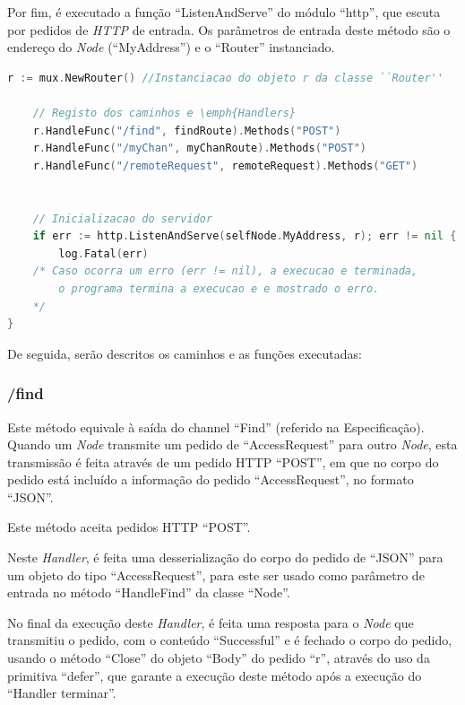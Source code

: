Por fim, é executado a função ``ListenAndServe'' do módulo ``http'', que escuta por pedidos de \emph{HTTP} de entrada.
Os parâmetros de entrada deste método são o endereço do \emph{Node} (``MyAddress'') e o ``Router'' instanciado.


\begin{lstlisting}[caption={Instanciacão e inicialização do servidor \acs{HTTP}},language=Go]
	r := mux.NewRouter() //Instanciacao do objeto r da classe ``Router''

	// Registo dos caminhos e \emph{Handlers}
	r.HandleFunc("/find", findRoute).Methods("POST")
	r.HandleFunc("/myChan", myChanRoute).Methods("POST")
	r.HandleFunc("/remoteRequest", remoteRequest).Methods("GET")


	// Inicializacao do servidor
	if err := http.ListenAndServe(selfNode.MyAddress, r); err != nil {
		log.Fatal(err) 				
	/* Caso ocorra um erro (err != nil), a execucao e terminada, 
		o programa termina a execucao e e mostrado o erro.
	*/
}
\end{lstlisting}




De seguida, serão descritos os caminhos e as funções executadas:

\subsubsection*{/find}
Este método equivale à saída do channel ``Find'' (referido na Especificação).
Quando um \emph{Node} transmite um pedido de ``AccessRequest'' para outro \emph{Node},
esta transmissão é feita através de um pedido \acs{HTTP} ``POST'', em que no corpo 
do pedido está incluído a informação do pedido ``AccessRequest'', no formato ``JSON''.

Este método aceita pedidos \acs{HTTP} ``POST''.

Neste \emph{Handler}, é feita uma desserialização do corpo do pedido de ``JSON'' para um objeto
do tipo ``AccessRequest'', para este ser usado como parâmetro de entrada no método ``HandleFind''
da classe ``Node''.

No final da execução deste \emph{Handler}, é feita uma resposta para o \emph{Node} que transmitiu o pedido, com o conteúdo ``Successful''
e é fechado o corpo do pedido, usando o método ``Close'' do objeto ``Body'' do pedido ``r'',
através do uso da primitiva ``defer'', que garante a execução deste método após a execução do ``Handler terminar''.

